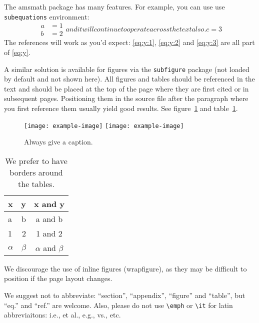 \documentclass[a4paper,11pt]{article}
\begin{document}
The amsmath package has many features. For example, you can use use
\texttt{subequations} environment:
\begin{subequations}\label{eq:y}
\begin{align}
\label{eq:y:1}
a & = 1
\\
\label{eq:y:2}
b & = 2
\end{align}
and it will continue to operate across the text also.
\begin{equation}
\label{eq:y:3}
c = 3
\end{equation}
\end{subequations}
The references will work as you'd expect: \eqref{eq:y:1},
\eqref{eq:y:2} and \eqref{eq:y:3} are all part of \eqref{eq:y}.

A similar solution is available for figures via the \texttt{subfigure}
package (not loaded by default and not shown here).
All figures and tables should be referenced in the text and should be
placed at the top of the page where they are first cited or in
subsequent pages. Positioning them in the source file
after the paragraph where you first reference them usually yield good
results. See figure~\ref{fig:i} and table~\ref{tab:i}.

\begin{figure}[tbp]
\centering 
\texttt{[image: example-image]}
\hfill
\texttt{[image: example-image]}
\caption{\label{fig:i} Always give a caption.}
\end{figure}

\begin{table}[tbp]
\centering
\begin{tabular}{|lr|c|}
\hline
x&y&x and y\\
\hline
a & b & a and b\\
1 & 2 & 1 and 2\\
$\alpha$ & $\beta$ & $\alpha$ and $\beta$\\
\hline
\end{tabular}
\caption{\label{tab:i} We prefer to have borders around the tables.}
\end{table}

We discourage the use of inline figures (wrapfigure), as they may be
difficult to position if the page layout changes.

We suggest not to abbreviate: ``section'', ``appendix'', ``figure''
and ``table'', but ``eq.'' and ``ref.'' are welcome. Also, please do
not use \texttt{\textbackslash emph} or \texttt{\textbackslash it} for
latin abbreviaitons: i.e., et al., e.g., vs., etc.
\end{document}
